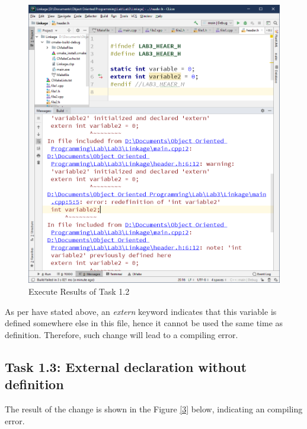 \documentclass[a4paper]{report}
\begin{document}
\begin{figure}
  \centering
  \includegraphics[scale=0.5]{Onetow.PNG}
  \caption{Execute Results of Task 1.2}\label{2}
\end{figure}


As per have stated above, an \emph{extern} keyword indicates that this variable is defined somewhere else in this file, hence it cannot be used the same time as definition. Therefore, such change will lead to a compiling error.
\subsection{Task 1.3: External declaration without definition}

The result of the change is shown in the Figure \ref{3} below, indicating an compiling error.
\end{document}
